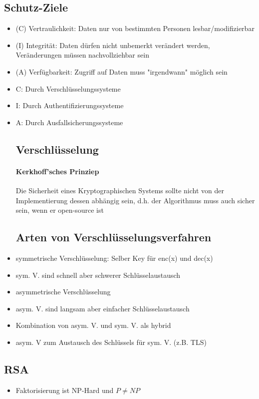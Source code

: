 \documentclass[12pt,a4paper]{article}
\begin{document}
\subsection{Schutz-Ziele}
\begin{itemize}
\item (C) Vertraulichkeit: Daten nur von bestimmten Personen lesbar/modifizierbar
\item (I) Integrität: Daten dürfen nicht unbemerkt verändert werden, Veränderungen müssen nachvollziehbar sein
\item (A) Verfügbarkeit: Zugriff auf Daten muss "irgendwann" möglich sein
\item C: Durch Verschlüsselungssysteme
\item I: Durch Authentifizierungssysteme
\item A: Durch Ausfallsicherungssysteme

\subsection{Verschlüsselung}
\paragraph{Kerkhoff'sches Prinziep}
\flushleft
Die Sicherheit eines Kryptographischen Systems sollte nicht von der Implementierung dessen abhängig sein, d.h. der Algorithmus muss auch sicher sein, wenn er open-source ist

\subsection{Arten von Verschlüsselungsverfahren}
\item symmetrische Verschlüsselung: Selber Key für enc(x) und dec(x)
\item sym. V. sind schnell aber schwerer Schlüsselaustausch
\item asymmetrische Verschlüsselung
\item asym. V. sind langsam aber einfacher Schlüsselaustausch
\item Kombination von asym. V. und sym. V. als hybrid
\item asym. V zum Austausch des Schlüssels für sym. V. (z.B. TLS)
\end{itemize}

\subsection{RSA}
\begin{itemize}
\item Faktorisierung ist NP-Hard und $P \neq NP$

\end{itemize}
\end{document}
